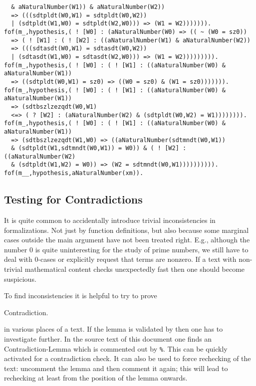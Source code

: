 \documentclass[11pt]{article}
\begin{document}
\begin{scriptsize}
\begin{verbatim}
  & aNaturalNumber(W1)) & aNaturalNumber(W2)) 
  => (((sdtpldt(W0,W1) = sdtpldt(W0,W2)) 
  | (sdtpldt(W1,W0) = sdtpldt(W2,W0))) => (W1 = W2))))))).
fof(m_,hypothesis,( ! [W0] : (aNaturalNumber(W0) => (( ~ (W0 = sz0)) 
  => ( ! [W1] : ( ! [W2] : ((aNaturalNumber(W1) & aNaturalNumber(W2)) 
  => (((sdtasdt(W0,W1) = sdtasdt(W0,W2)) 
  | (sdtasdt(W1,W0) = sdtasdt(W2,W0))) => (W1 = W2))))))))).
fof(m_,hypothesis,( ! [W0] : ( ! [W1] : ((aNaturalNumber(W0) & aNaturalNumber(W1)) 
  => ((sdtpldt(W0,W1) = sz0) => ((W0 = sz0) & (W1 = sz0))))))).
fof(m_,hypothesis,( ! [W0] : ( ! [W1] : ((aNaturalNumber(W0) & aNaturalNumber(W1)) 
  => (sdtbszlzezqdt(W0,W1) 
  <=> ( ? [W2] : (aNaturalNumber(W2) & (sdtpldt(W0,W2) = W1)))))))).
fof(m_,hypothesis,( ! [W0] : ( ! [W1] : ((aNaturalNumber(W0) & aNaturalNumber(W1)) 
  => (sdtbszlzezqdt(W1,W0) => ((aNaturalNumber(sdtmndt(W0,W1)) 
  & (sdtpldt(W1,sdtmndt(W0,W1)) = W0)) & ( ! [W2] : ((aNaturalNumber(W2) 
  & (sdtpldt(W1,W2) = W0)) => (W2 = sdtmndt(W0,W1)))))))))).
fof(m__,hypothesis,aNaturalNumber(xm)).
\end{verbatim}
\end{scriptsize}

\subsection{Testing for Contradictions}

It is quite common to accidentally introduce trivial inconsistencies
in formalizations. Not just by function definitions, but also
because some marginal cases outside the main argument have not
been treated right. E.g., although the number $0$ is quite 
uninteresting for the study of prime numbers, we still have to
deal with $0$-cases or explicitly request that terms are
nonzero. If a text with non-trivial mathematical content checks
unexpectedly fast then one should become suspicious.

To find inconsistencies it is helpful to try to prove
\begin{lemma} Contradiction. \end{lemma}
in various places of a text. If the lemma is validated by 
\Naproche{} then one has to investigate further. In the source text
of this document one finds an Contradiction-Lemma which is commented
out by \verb+%+. This can be quickly activated for a contradiction
check. It can also be used to force rechecking of the text: uncomment
the lemma and then comment it again; this will lead to rechecking at
least from the position of the lemma onwards.  
\end{document}
